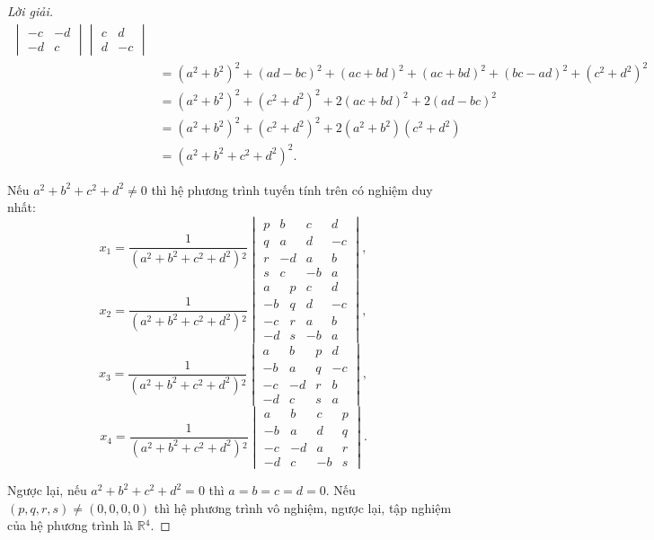 \documentclass[class=nhvh-linear-algebra,crop=false]{standalone}
\begin{document}
\begin{proof}[Lời giải]
\begin{align*}
		\begin{vmatrix}
			-c & -d \\
			-d & c
		\end{vmatrix}
		\begin{vmatrix}
			c & d  \\
			d & -c
		\end{vmatrix}                                                                                                 \\
		 & = {(a^{2}+b^{2})}^{2} + {(ad-bc)}^{2} + {(ac+bd)}^{2} + {(ac+bd)}^{2} + {(bc-ad)}^{2} + {(c^{2}+d^{2})}^{2} \\
		 & = {(a^{2}+b^{2})}^{2} + {(c^{2}+d^{2})}^{2} + 2{(ac+bd)}^{2} + 2{(ad-bc)}^{2}                               \\
		 & = {(a^{2}+b^{2})}^{2} + {(c^{2}+d^{2})}^{2} + 2(a^{2}+b^{2})(c^{2}+d^{2})                                   \\
		 & = {(a^{2}+b^{2}+c^{2}+d^{2})}^{2}.
	\end{align*}
	\endgroup{}
	\par Nếu $a^{2} + b^{2} + c^{2} + d^{2} \ne 0$ thì hệ phương trình tuyến tính trên có nghiệm duy nhất:
	\[
		x_{1} = \dfrac{1}{(a^{2} + b^{2} + c^{2} + d^{2}){}^{2}}
		\begin{vmatrix}
			p & b  & c  & d  \\
			q & a  & d  & -c \\
			r & -d & a  & b  \\
			s & c  & -b & a
		\end{vmatrix},
	\]
	\[
		x_{2} = \dfrac{1}{(a^{2} + b^{2} + c^{2} + d^{2}){}^{2}}
		\begin{vmatrix}
			a  & p & c  & d  \\
			-b & q & d  & -c \\
			-c & r & a  & b  \\
			-d & s & -b & a
		\end{vmatrix},
	\]
	\[
		x_{3} = \dfrac{1}{(a^{2} + b^{2} + c^{2} + d^{2}){}^{2}}
		\begin{vmatrix}
			a  & b  & p & d  \\
			-b & a  & q & -c \\
			-c & -d & r & b  \\
			-d & c  & s & a
		\end{vmatrix},
	\]
	\[
		x_{4} = \dfrac{1}{(a^{2} + b^{2} + c^{2} + d^{2}){}^{2}}
		\begin{vmatrix}
			a  & b  & c  & p \\
			-b & a  & d  & q \\
			-c & -d & a  & r \\
			-d & c  & -b & s
		\end{vmatrix}.
	\]
	\par Ngược lại, nếu $a^{2} + b^{2} + c^{2} + d^{2} = 0$ thì $a = b = c = d = 0$. Nếu $(p, q, r, s) \ne (0, 0, 0, 0)$ thì hệ phương trình vô nghiệm, ngược lại, tập nghiệm của hệ phương trình là $\mathbb{R}{}^{4}$.
\end{proof}
\end{document}
